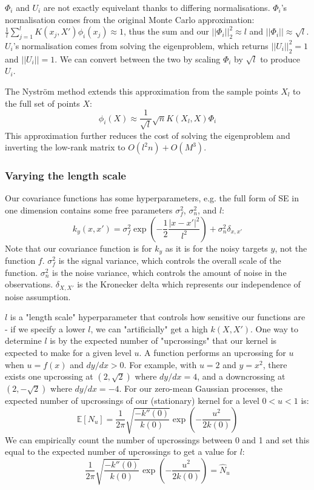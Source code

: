 $\Phi_i$ and $U_i$ are not exactly equivelant thanks to differing normalisations. $\Phi_i$'s normalisation comes from the original Monte Carlo approximation: $\frac{1}{l} \sum_{j=1}^{l} K(x_j, X') \phi_i(x_j) \approx 1$, thus the sum and our $||\Phi_i||_2^2 \approx l$ and $||\Phi_i|| \approx \sqrt{l}$. $U_i$'s normalisation comes from solving the eigenproblem, which returns $||U_i||_2^2 = 1$ and $||U_i|| = 1$. We can convert between the two by scaling $\Phi_i$ by $\sqrt{l}$ to produce $U_i$.

The Nyström method \cite{nystrom} extends this approximation from the sample points $X_l$ to the full set of points $X$:
\begin{equation*}
    \phi_i(X) \approx \frac{1}{\sqrt{l}} \sqrt{n} K(X_l, X) \Phi_i
\end{equation*}
This approximation further reduces the cost of solving the eigenproblem and inverting the low-rank matrix to $O(l^2 n) + O(M^3)$.


\subsubsection{Varying the length scale}
Our covariance functions has some hyperparameters, e.g. the full form of SE in one dimension contains some free parameters $\sigma^2_f$, $\sigma^2_n$, and $l$:
\begin{equation*}
    k_y(x,x') = \sigma^2_f \exp\left(-\frac{1}{2}\frac{|x - x'|^2}{l^2}\right) + \sigma^2_n\delta_{x,x'}
\end{equation*}
Note that our covariance function is for $k_y$ as it is for the noisy targets $y$, not the function $f$. $\sigma^2_f$ is the signal variance, which controls the overall scale of the function. $\sigma^2_n$ is the noise variance, which controls the amount of noise in the observations. $\delta_{X,X'}$ is the Kronecker delta which represents our independence of noise assumption.

$l$ is a "length scale" hyperparameter that controls how sensitive our functions are - if we specify a lower $l$, we can "artificially" get a high $k(X,X')$. One way to determine $l$ is by the expected number of "upcrossings" that our kernel is expected to make for a given level $u$. A function performs an upcrossing for $u$ when $u = f(x)$ and $dy/dx > 0$. For example, with $u = 2$ and $y = x^2$, there exists one upcrossing at $(2, \sqrt{2})$ where $dy/dx = 4$, and a downcrossing at $(2, -\sqrt{2})$ where $dy/dx = -4$. For our zero-mean Gaussian processes, the expected number of upcrossings of our (stationary) kernel for a level $ 0 < u < 1$ is:
\begin{equation*}
    \mathbb{E}[N_u] = \frac{1}{2\pi} \sqrt{\frac{-k''(0)}{k(0)}} \exp \left(-\frac{u^2}{2k(0)}\right)
\end{equation*}
We can empirically count the number of upcrossings between 0 and 1 and set this equal to the expected number of upcrossings to get a value for $l$:
\begin{equation} \label{eq:general_l}
    \frac{1}{2\pi} \sqrt{\frac{-k''(0)}{k(0)}} \exp \left(-\frac{u^2}{2k(0)}\right) = \hat{N}_u
\end{equation}

